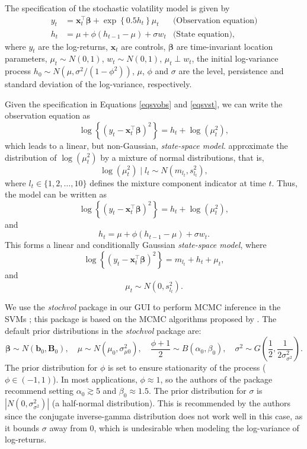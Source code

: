 The specification of the stochastic volatility model is given by
\begin{align}
	y_t&=\bm{x}_t^{\top}\bm{\beta}+\exp\left\{0.5h_t\right\}\mu_t& \text{(Observation equation)}\label{eqsvobs}\\
	h_t&=\mu+\phi(h_{t-1}-\mu)+\sigma w_t& \text{(State equation)}\label{eqsvst},
\end{align}
where $y_t$ are the log-returns, $\bm{x}_t$ are controls, $\bm{\beta}$ are time-invariant location parameters, $\mu_t\sim N(0,1)$, $w_t\sim N(0,1)$, $\mu_t\perp w_t$, the initial log-variance process $h_0\sim N(\mu, \sigma^2/(1-\phi^2))$, $\mu$, $\phi$ and $\sigma$ are the level, persistence and standard deviation of the log-variance, respectively.

Given the specification in Equations \ref{eqsvobs} and \ref{eqsvst}, we can write the observation equation as 
\[
\log\left\{(y_t-\bm{x}_t^{\top}\bm{\beta})^2\right\} = h_t + \log(\mu_t^2),
\]
which leads to a linear, but non-Gaussian, \textit{state-space model}. \cite{kastner2014ancillarity} approximate the distribution of $\log(\mu_t^2)$ by a mixture of normal distributions, that is, 
\[
\log(\mu_t^2)\mid l_t \sim N(m_{l_t},s_{l_t}^2),
\]
where $l_t \in \{1, 2, \dots, 10\}$ defines the mixture component indicator at time $t$. Thus, the model can be written as
\[
\log\left\{(y_t-\bm{x}_t^{\top}\bm{\beta})^2\right\} = h_t + \log(\mu_t^2),
\]
and
\[
h_t = \mu + \phi(h_{t-1} - \mu) + \sigma w_t.
\]
This forms a linear and conditionally Gaussian \textit{state-space model}, where
\[
\log\left\{(y_t-\bm{x}_t^{\top}\bm{\beta})^2\right\} = m_{l_t} + h_t + \mu_t,
\]
and
\[
\mu_t \sim N(0, s_{l_t}^2).
\]

We use the \textit{stochvol} package in our GUI to perform MCMC inference in the SVMs \cite{hosszejni_kastner_2021}; this package is based on the MCMC algorithms proposed by \cite{kastner2014ancillarity}. The default prior distributions in the \textit{stochvol} package are: 
\[
\bm{\beta} \sim N(\bm{b}_0, \bm{B}_0), \quad \mu \sim N(\mu_0, \sigma_{\mu0}^2), \quad \frac{\phi+1}{2} \sim B(\alpha_0, \beta_0), \quad \sigma^2 \sim G\left(\frac{1}{2}, \frac{1}{2\sigma^2_{\sigma^2}}\right).
\]
The prior distribution for $\phi$ is set to ensure stationarity of the process ($\phi \in (-1,1)$). In most applications, $\phi \approx 1$, so the authors of the package recommend setting $\alpha_0 \gtrsim 5$ and $\beta_0 \approx 1.5$. The prior distribution for $\sigma$ is $ |N(0, \sigma^2_{\sigma^2})|$ (a half-normal distribution). This is recommended by the authors since the conjugate inverse-gamma distribution does not work well in this case, as it bounds $\sigma$ away from 0, which is undesirable when modeling the log-variance of log-returns.

